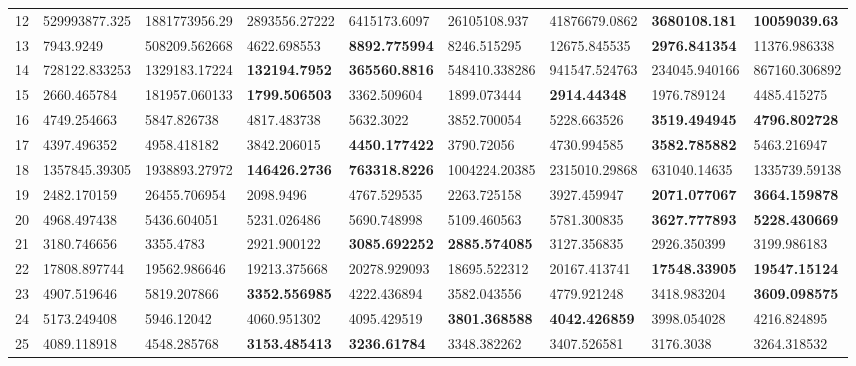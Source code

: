 \begin{table*}[t]
\begin{tabular}{|p{0.8cm}|p{1.6cm}|p{1.6cm}|p{1.6cm}|p{1.6cm}|p{1.6cm}|p{1.6cm}|p{1.6cm}|p{1.6cm}|}
12  & 529993877.325 & 1881773956.29 & 2893556.27222 & 6415173.6097 & 26105108.937 & 41876679.0862 & \textbf{3680108.181} & \textbf{10059039.63} \\ 
13  & 7943.9249 & 508209.562668 & 4622.698553 & \textbf{8892.775994} & 8246.515295 & 12675.845535 & \textbf{2976.841354} & 11376.986338 \\ 
14  & 728122.833253 & 1329183.17224 & \textbf{132194.7952} & \textbf{365560.8816} & 548410.338286 & 941547.524763 & 234045.940166 & 867160.306892 \\ 
15  & 2660.465784 & 181957.060133 & \textbf{1799.506503} & 3362.509604 & 1899.073444 & \textbf{2914.44348} & 1976.789124 & 4485.415275 \\ 
16  & 4749.254663 & 5847.826738 & 4817.483738 & 5632.3022 & 3852.700054 & 5228.663526 & \textbf{3519.494945} & \textbf{4796.802728} \\ 
17  & 4397.496352 & 4958.418182 & 3842.206015 & \textbf{4450.177422} & 3790.72056 & 4730.994585 & \textbf{3582.785882} & 5463.216947 \\ 
18  & 1357845.39305 & 1938893.27972 & \textbf{146426.2736} & \textbf{763318.8226} & 1004224.20385 & 2315010.29868 & 631040.14635 & 1335739.59138 \\ 
19  & 2482.170159 & 26455.706954 & 2098.9496 & 4767.529535 & 2263.725158 & 3927.459947 & \textbf{2071.077067} & \textbf{3664.159878} \\ 
20  & 4968.497438 & 5436.604051 & 5231.026486 & 5690.748998 & 5109.460563 & 5781.300835 & \textbf{3627.777893} & \textbf{5228.430669} \\ 
21  & 3180.746656 & 3355.4783 & 2921.900122 & \textbf{3085.692252} & \textbf{2885.574085} & 3127.356835 & 2926.350399 & 3199.986183 \\ 
22  & 17808.897744 & 19562.986646 & 19213.375668 & 20278.929093 & 18695.522312 & 20167.413741 & \textbf{17548.33905} & \textbf{19547.15124} \\ 
23  & 4907.519646 & 5819.207866 & \textbf{3352.556985} & 4222.436894 & 3582.043556 & 4779.921248 & 3418.983204 & \textbf{3609.098575} \\ 
24  & 5173.249408 & 5946.12042 & 4060.951302 & 4095.429519 & \textbf{3801.368588} & \textbf{4042.426859} & 3998.054028 & 4216.824895 \\ 
25  & 4089.118918 & 4548.285768 & \textbf{3153.485413} & \textbf{3236.61784} & 3348.382262 & 3407.526581 & 3176.3038 & 3264.318532 \\ 

\end{tabular}
\end{table*}
